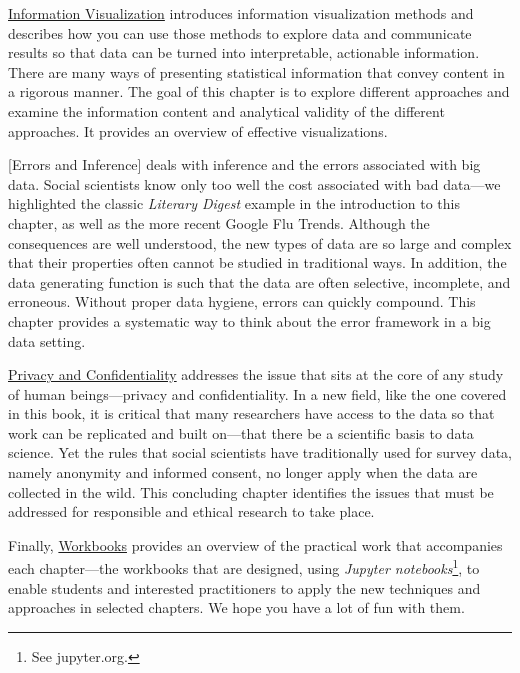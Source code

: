 \documentclass[]{krantz}
\begin{document}
\protect\hyperlink{chap:viz}{Information Visualization} introduces
information visualization methods and describes how you can use those
methods to explore data and communicate results so that data can be
turned into interpretable, actionable information. There are many ways
of presenting statistical information that convey content in a rigorous
manner. The goal of this chapter is to explore different approaches and
examine the information content and analytical validity of the different
approaches. It provides an overview of effective visualizations.

{[}Errors and Inference{]} deals with inference and the errors
associated with big data. Social scientists know only too well the cost
associated with bad data---we highlighted the classic \emph{Literary
Digest} example in the introduction to this chapter, as well as the more
recent Google Flu Trends. Although the consequences are well understood,
the new types of data are so large and complex that their properties
often cannot be studied in traditional ways. In addition, the data
generating function is such that the data are often selective,
incomplete, and erroneous. Without proper data hygiene, errors can
quickly compound. This chapter provides a systematic way to think about
the error framework in a big data setting.

\protect\hyperlink{chap:privacy}{Privacy and Confidentiality} addresses
the issue that sits at the core of any study of human beings---privacy
and confidentiality. In a new field, like the one covered in this book,
it is critical that many researchers have access to the data so that
work can be replicated and built on---that there be a scientific basis
to data science. Yet the rules that social scientists have traditionally
used for survey data, namely anonymity and informed consent, no longer
apply when the data are collected in the wild. This concluding chapter
identifies the issues that must be addressed for responsible and ethical
research to take place.

Finally, \protect\hyperlink{chap:workbooks}{Workbooks} provides an
overview of the practical work that accompanies each chapter---the
workbooks that are designed, using \emph{Jupyter notebooks}\footnote{See
  jupyter.org.}, to enable students and interested practitioners to
apply the new techniques and approaches in selected chapters. We hope
you have a lot of fun with them.
\end{document}
